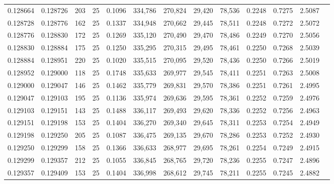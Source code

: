 \begin{tabular}{rrrrrrrrrrrrr}
0.128664 & 0.128726 &   203 &  25 &                                     0.1096 & 334,786 & 270,824 &  29,420 &  78,536 & 0.2248 & 0.7275 & 2.5087 \\
0.128728 & 0.128776 &   162 &  25 &                                     0.1337 & 334,948 & 270,662 &  29,445 &  78,511 & 0.2248 & 0.7272 & 2.5072 \\
0.128776 & 0.128830 &   172 &  25 &                                     0.1269 & 335,120 & 270,490 &  29,470 &  78,486 & 0.2249 & 0.7270 & 2.5056 \\
0.128830 & 0.128884 &   175 &  25 &                                     0.1250 & 335,295 & 270,315 &  29,495 &  78,461 & 0.2250 & 0.7268 & 2.5039 \\
0.128884 & 0.128951 &   220 &  25 &                                     0.1020 & 335,515 & 270,095 &  29,520 &  78,436 & 0.2250 & 0.7266 & 2.5019 \\
0.128952 & 0.129000 &   118 &  25 &                                     0.1748 & 335,633 & 269,977 &  29,545 &  78,411 & 0.2251 & 0.7263 & 2.5008 \\
0.129000 & 0.129047 &   146 &  25 &                                     0.1462 & 335,779 & 269,831 &  29,570 &  78,386 & 0.2251 & 0.7261 & 2.4995 \\
0.129047 & 0.129103 &   195 &  25 &                                     0.1136 & 335,974 & 269,636 &  29,595 &  78,361 & 0.2252 & 0.7259 & 2.4976 \\
0.129103 & 0.129151 &   143 &  25 &                                     0.1488 & 336,117 & 269,493 &  29,620 &  78,336 & 0.2252 & 0.7256 & 2.4963 \\
0.129151 & 0.129198 &   153 &  25 &                                     0.1404 & 336,270 & 269,340 &  29,645 &  78,311 & 0.2253 & 0.7254 & 2.4949 \\
0.129198 & 0.129250 &   205 &  25 &                                     0.1087 & 336,475 & 269,135 &  29,670 &  78,286 & 0.2253 & 0.7252 & 2.4930 \\
0.129250 & 0.129299 &   158 &  25 &                                     0.1366 & 336,633 & 268,977 &  29,695 &  78,261 & 0.2254 & 0.7249 & 2.4915 \\
0.129299 & 0.129357 &   212 &  25 &                                     0.1055 & 336,845 & 268,765 &  29,720 &  78,236 & 0.2255 & 0.7247 & 2.4896 \\
0.129357 & 0.129409 &   153 &  25 &                                     0.1404 & 336,998 & 268,612 &  29,745 &  78,211 & 0.2255 & 0.7245 & 2.4882 \\

\end{tabular}
